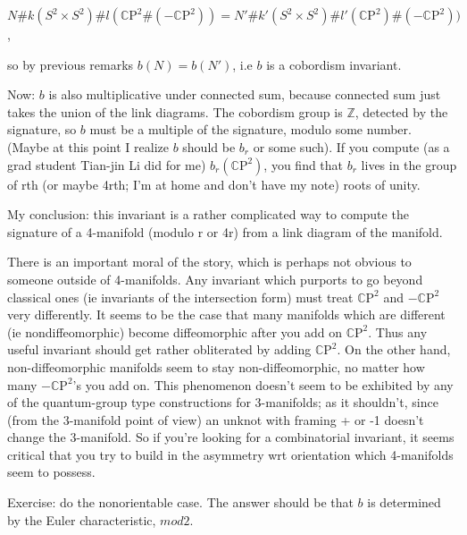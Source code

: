 $N \# k(S^2 \times S^2)\# l(\mathbb{C}\mathrm{P}^2 \# (- \mathbb{C}\mathrm{P}^2)) = N' \# k'(S^2 \times S^2) \# l'( \mathbb{C}\mathrm{P}^2) \# (-\mathbb{C}\mathrm{P}^2))$,

so by previous remarks $b(N) = b(N')$, i.e $b$ is a cobordism invariant.

Now: $b$ is also multiplicative under connected sum, because connected sum just takes the union of the link diagrams. The cobordism group is $\mathbb{Z}$, detected by the signature, so $b$ must be a multiple of the signature, modulo some number. (Maybe at this point I realize $b$ should be $b_r$ or some such). If you compute (as a grad student Tian-jin Li did for me) $b_r(\mathbb{C}\mathrm{P}^2)$, you find that $b_r$ lives in the group of rth (or maybe 4rth; I'm at home and don't have my note) roots of unity.

My conclusion: this invariant is a rather complicated way to compute the signature of a 4-manifold (modulo r or 4r) from a link diagram of the manifold.

There is an important moral of the story, which is perhaps not obvious to someone outside of 4-manifolds. Any invariant which purports to go beyond classical ones (ie invariants of the intersection form) must treat $ \mathbb{C}\mathrm{P}^2$ and $ -\mathbb{C}\mathrm{P}^2$ very differently. It seems to be the case that many manifolds which are different (ie nondiffeomorphic) become diffeomorphic after you add on $ \mathbb{C}\mathrm{P}^2$. Thus any useful invariant should get rather obliterated by adding $ \mathbb{C}\mathrm{P}^2$. On the other hand, non-diffeomorphic manifolds seem to stay non-diffeomorphic, no matter how many $-\mathbb{C}\mathrm{P}^2$'s you add on. This phenomenon doesn't seem to be exhibited by any of the quantum-group type constructions for 3-manifolds; as it shouldn't, since (from the 3-manifold point of view) an unknot with framing + or -1 doesn't change the 3-manifold. So if you're looking for a combinatorial invariant, it seems critical that you try to build in the asymmetry wrt orientation which 4-manifolds seem to possess.

Exercise: do the nonorientable case. The answer should be that $b$ is determined by the Euler characteristic, $mod  2$. 